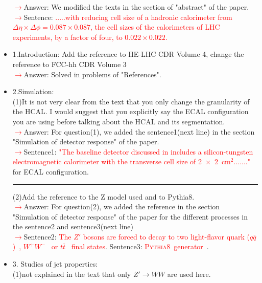 \documentclass[final,1p,11pt]{elsarticle}
\newcommand{\pythia} {\textsc{Pythia8~}}
\begin{document}
\begin{itemize}
 \textcolor{red}{$\rightarrow$}Answer: We modified the texts in the section of "abstract" of the paper.\\
 \textcolor{red}{$\rightarrow$}Sentence: \textcolor{red}{.....with reducing cell size of a hadronic calorimeter from $\Delta \eta \times \Delta \phi = 0.087\times0.087$, the cell sizes of the calorimeters of LHC experiments, by a factor of four, to  $0.022\times0.022$.} 
\item 1.Introduction: Add the reference to HE-LHC CDR Volume 4, change the reference to FCC-hh CDR Volume 3\\
\textcolor{red}{$\rightarrow$}Answer: Solved in problems of "References".
\item 2.Simulation:\\
(1)It is not very clear from the text that you only change the granularity of the HCAL. I would suggest that you explicitly say the ECAL configuration you are using before talking about the HCAL and its segmentation.\\
 \textcolor{red}{$\rightarrow$}Answer: For question(1), we added the sentence1(next line) in the section "Simulation of detector response" of the paper.\\
 \textcolor{red}{$\rightarrow$}Sentence1: \textcolor{red}{"The baseline detector discussed in \cite{Chekanov:2016ppq}
includes a silicon-tungsten electromagnetic calorimeter with the transverse cell size of 2~$\times$~2~cm$^2$......."} for ECAL configuration.\\
 \rule{\textwidth}{0.4pt}
(2)Add the reference to the Z model used and to Pythia8.\\
 \textcolor{red}{$\rightarrow$}Answer: For question(2), we added the reference in the section "Simulation of detector response" of the paper for the different processes in the sentence2 and sentence3(next line)\\
\textcolor{red}{$\rightarrow$}Sentence2:  \textcolor{red}{The $Z'$ bosons are forced to decay to two light-flavor quark ($q\bar{q}$)~\cite{Langacker:2008yv}, $W^+W^-$~\cite{Leike:1998wr} or $t\bar{t}$~\cite{Rosner:1996eb} final states}. Sentence3: \textcolor{red}{\pythia generator~\cite{Sjostrand:2006za}}.\\
\item 3. Studies of jet properties:\\
(1)not explained in the text that only $Z' \rightarrow WW$ are used here. \\

\end{itemize}
\end{document}
